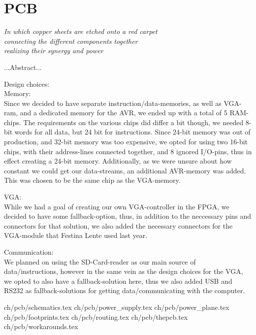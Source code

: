 \chapter {PCB}\label{ch:pcb}

\begin {flushright} {\slshape
    In which copper sheets are etched onto a red carpet\\
    connecting the different components together\\
    realizing their synergy and power
}
\end {flushright}
...Abstract...

Design choices: \\
Memory: \\
Since we decided to have separate instruction/data-memories, as well as VGA-ram, and
a dedicated memory for the AVR, we ended up with a total of 5 RAM-chips. The requirements
on the various chips did differ a bit though, we needed 8-bit words for all data, but
24 bit for instructions. Since 24-bit memory was out of production, and 32-bit memory
was too expensive, we opted for using two 16-bit chips, with their address-lines connected
together, and 8 ignored I/O-pins, thus in effect creating a 24-bit memory. Additionally,
as we were unsure about how constant we could get our data-streams, an additional
AVR-memory was added. This was chosen to be the same chip as the VGA-memory.

VGA: \\
While we had a goal of creating our own VGA-controller in the FPGA, we decided to have
some fallback-option, thus, in addition to the neccessary pins and connectors for that
solution, we also added the necessary connectors for the VGA-module that Festina Lente
used last year.

Communication: \\
We planned on using the SD-Card-reader as our main source of data/instructions, however
in the same vein as the design choices for the VGA, we opted to also have a fallback-solution
here, thus we also added USB and RS232 as fallback-solutions for getting data/communicating
with the computer.

 {ch/pcb/schematics.tex}
 {ch/pcb/power_supply.tex}
 {ch/pcb/power_plane.tex}
 {ch/pcb/footprints.tex}
 {ch/pcb/routing.tex}
 {ch/pcb/thepcb.tex}
 {ch/pcb/workarounds.tex}

